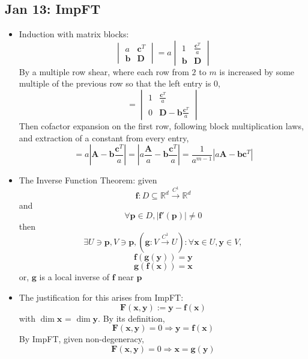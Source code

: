 \documentclass[10pt, oneside]{article}
\newcommand{\R}{\mathbb{R}}
\renewcommand{\vec}[1]{\mathbf{#1}}
\newcommand{\vecf}[1]{\boldsymbol{#1}}
\newcommand{\mat}[1]{\mathbf{#1}}
\begin{document}
\subsection{Jan 13: ImpFT}
\begin{itemize}
    \item Induction with matrix blocks:
        \[\begin{vmatrix}
        a & \vec{c}^T \\ \vec{b} & \mat{D}
        \end{vmatrix}
        = a\begin{vmatrix}
        1 & \frac{\vec{c}^T}{a} \\ \vec{b} & \mat{D}
        \end{vmatrix}\]
        By a multiple row shear, where each row from $2$ to $m$ is increased by some multiple of the previous row so that the left entry is $0$,
        \[= \begin{vmatrix}
        1 & \frac{\vec{c}^T}{a} \\ 0 & \mat{D} - \vec{b} \frac{\vec{c}^T}{a}
        \end{vmatrix}\]
        Then cofactor expansion on the first row, following block multiplication laws, and extraction of a constant from every entry,
        \[= a \left|\mat{A} - \vec{b}\frac{\vec{c}^T}{a}\right| = \left|a\frac{\mat{A}}{a} - \vec{b}\frac{\vec{c}^T}{a}\right| = \frac{1}{a^{m-1}} \left|a\mat{A} - \vec{b} \vec{c}^T\right|\]
    \item The Inverse Function Theorem: given 
        \[\vecf{f} : D \subseteq \R^d \overset{C^1}{\rightarrow} \R^d\] 
        and 
        \[\forall \vec{p} \in D, |\vecf{f'}(\vec{p})| \neq 0\]
        then 
        \[\exists U \ni \vec{p}, V \ni \vec{p}, (\vecf{g} : V \overset{C^1}{\rightarrow} U) : \forall \vec{x} \in U, \vec{y} \in V,\]
        \[\vecf{f}(\vecf{g}(\vec{y})) = \vec{y}\] %
        \[\vecf{g}(\vecf{f}(\vec{x})) = \vec{x}\]
        or, $\vecf{g}$ is a local inverse of $\vecf{f}$ near $\vec{p}$
    \item The justification for this arises from ImpFT:
        \[\vecf{F}(\vec{x},\vec{y}) := \vec{y} - \vecf{f}(\vec{x})\]
        with $\dim \vec{x}$ = $\dim \vec{y}$. By its definition,
        \[\vecf{F}(\vec{x},\vec{y}) = 0 \Rightarrow \vec{y} = \vecf{f}(\vec{x})\]
        By ImpFT, given non-degeneracy,
        \[\vecf{F}(\vec{x},\vec{y}) = 0 \Rightarrow \vec{x} = \vecf{g}(\vec{y})\]
\end{itemize} 
\end{document}
